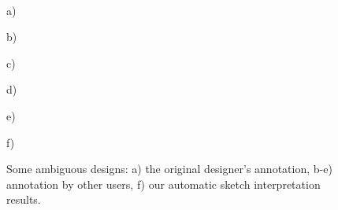 \begin{figure}[t]
\vspace{-0.35in}
\\
\begin{minipage}{0.74in}\textcolor[rgb]{0,0,0}{\hspace{-0.01in} { a)}} \end{minipage}
\begin{minipage}{0.74in}\textcolor[rgb]{0,0,0}{\hspace{-0.01in} { b)}} \end{minipage}
\begin{minipage}{0.74in}\textcolor[rgb]{0,0,0}{\hspace{-0.01in} { c)}} \end{minipage}
\begin{minipage}{0.74in}\textcolor[rgb]{0,0,0}{\hspace{-0.01in} { d)}} \end{minipage}
\begin{minipage}{0.74in}\textcolor[rgb]{0,0,0}{\hspace{-0.01in} { e)}} \end{minipage}
\begin{minipage}{0.74in}\textcolor[rgb]{0,0,0}{\hspace{-0.01in} { f)}} \end{minipage}
\caption{Some ambiguous designs: a) the original designer's
  annotation, b-e) annotation by other users, f) our automatic sketch
  interpretation results. }
\label{figure:ambiguous}
\end{figure}


